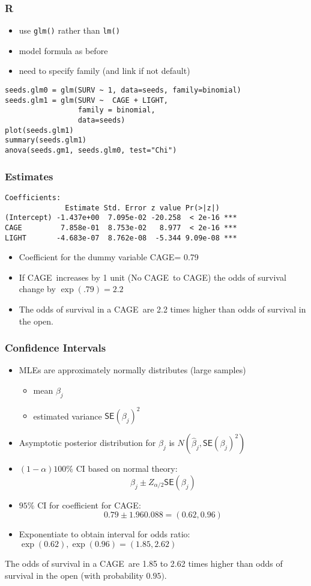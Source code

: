\documentclass[]{beamer}
\def\SE{\textsf{SE}}
\def\C{\textsf{CAGE}}
\begin{document}
\begin{frame}[fragile]\frametitle{R}
  \begin{itemize}
  \item use {\tt glm()} rather than {\tt lm()} \pause
  \item model formula as before  \pause
  \item need to specify family (and link if not default) \pause
  \end{itemize}
\begin{verbatim}
seeds.glm0 = glm(SURV ~ 1, data=seeds, family=binomial)
seeds.glm1 = glm(SURV ~  CAGE + LIGHT, 
                 family = binomial,
                 data=seeds)
plot(seeds.glm1)
summary(seeds.glm1)
anova(seeds.gm1, seeds.glm0, test="Chi")
\end{verbatim}
\end{frame}
\begin{frame}[fragile]\frametitle{Estimates}
\begin{verbatim}
Coefficients:
              Estimate Std. Error z value Pr(>|z|)    
(Intercept) -1.437e+00  7.095e-02 -20.258  < 2e-16 ***
CAGE         7.858e-01  8.753e-02   8.977  < 2e-16 ***
LIGHT       -4.683e-07  8.762e-08  -5.344 9.09e-08 ***
\end{verbatim}
  \begin{itemize}
  \item Coefficient for the dummy variable \C = 0.79 \pause
  \item If \C\ increases by 1 unit (No \C\ to \C) the odds of survival change by
  $\exp(.79) = 2.2$ \pause
\item The odds of survival in a \C\ are 2.2 times higher than odds of
  survival in the open. \pause
  \end{itemize}

\end{frame}
\begin{frame}\frametitle{Confidence Intervals}
  \begin{itemize}
  \item MLEs are approximately normally distributes (large samples) \pause
    \begin{itemize}
    \item mean $\beta_j$ \pause
    \item estimated variance $\SE(\beta_j)^2$ \pause
    \end{itemize}
\item Asymptotic posterior distribution for $\beta_j$ is
  $N(\hat{\beta}_j, \SE(\beta_j)^2)$ \pause
\item $(1 - \alpha) 100\%$ CI based on normal theory:
$$ \hat{\beta}_j \pm Z_{\alpha/2} \SE(\beta_j)$$ \pause
\item $95\%$ CI for coefficient for \C:
$$ 0.79 \pm 1.96 0.088 = (0.62, 0.96) $$ \pause
\item Exponentiate to obtain interval for odds ratio:
$\exp(0.62), \exp(0.96) = (1.85,  2.62)$ \pause
  \end{itemize}
 The odds of survival in a \C\  are 1.85 to 2.62 times higher than odds of
  survival in the open (with probability  $0.95)$.
\end{frame}
\end{document}
